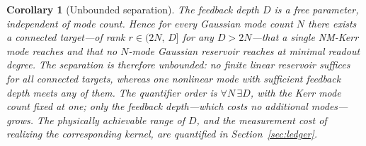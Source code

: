 \documentclass[11pt]{article}
\newtheorem{corollary}{Corollary}
\theoremstyle{remark}
\begin{document}
\begin{corollary}[Unbounded separation]
\label{cor:unbounded}
The feedback depth $D$ is a free parameter, independent of mode count. Hence for
every Gaussian mode count $N$ there exists a connected target---of rank
$r\in(2N,\,D]$ for any $D>2N$---that a single NM-Kerr mode reaches and that no
$N$-mode Gaussian reservoir reaches at minimal readout degree. The separation is
therefore unbounded: no finite linear reservoir suffices for all connected targets,
whereas one nonlinear mode with sufficient feedback depth meets any of them. The
quantifier order is $\forall N\,\exists D$, with the Kerr mode count fixed at one;
only the feedback depth---which costs no additional modes---grows. The physically
achievable range of $D$, and the measurement cost of realizing the corresponding
kernel, are quantified in Section~\ref{sec:ledger}.
\end{corollary}
\end{document}
